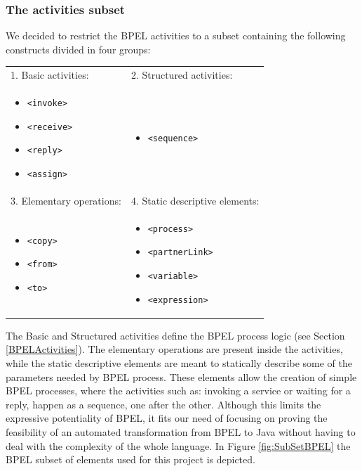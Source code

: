 \subsubsection{The activities subset}
We decided to restrict the BPEL activities to a subset containing the following constructs divided in four groups:
\begin{center}
\begin{supertabular}{p{0.4\textwidth}p{0.4\textwidth}}

1. Basic activities: 			& 2. Structured activities:		\\
\begin{itemize}
	\item \verb|<invoke>|
	\item \verb|<receive>|
	\item \verb|<reply>|
	\item \verb|<assign>|
	\end{itemize} 			&

					    \begin{itemize}
					      \item \verb|<sequence>|
					     \end{itemize}			\\
					     
3. Elementary operations: 		& 4. Static descriptive elements:	\\					
\begin{itemize}
	\item \verb|<copy>|
	\item \verb|<from>|
	\item \verb|<to>|
  \end{itemize} &

					    \begin{itemize}
					      \item \verb|<process>|
					      \item \verb|<partnerLink>|
					      \item \verb|<variable>|
					      \item \verb|<expression>|
					    \end{itemize}\\
\end{supertabular}
\end{center}

The Basic and Structured activities define the BPEL process logic (see Section \ref{BPELActivities}). The elementary operations are present inside the activities, while the static descriptive elements are meant to statically describe some of the parameters needed by BPEL process.
These elements allow the creation of simple BPEL processes, where the activities such as: invoking a service or waiting for a reply, happen as a sequence, one after the other. Although this limits the expressive potentiality of BPEL, it fits our need of focusing on proving the feasibility of an automated transformation from BPEL to Java without having to deal with the complexity of the whole language.
In Figure \ref{fig:SubSetBPEL} the BPEL subset of elements used for this project is depicted.

